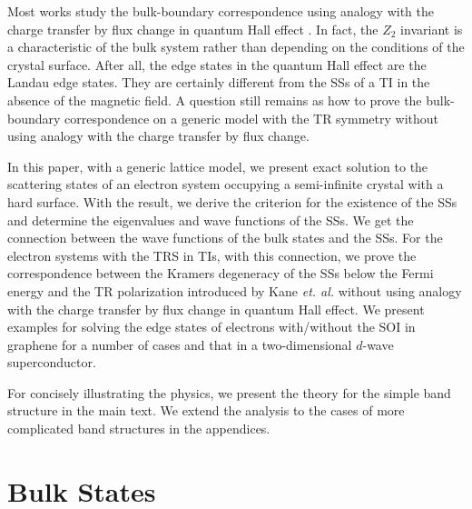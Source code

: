 \documentclass[aps,pra,amsmath,twocolumn,showpacs,bibnotes,10pt]{revtex4-1}
\begin{document}
Most works study the bulk-boundary correspondence using analogy with the charge transfer by flux change in quantum Hall effect \cite{Kane2,Fu,Fu2,Fu3,Qi2,Roy,Roy2}. In fact, the $Z_2$ invariant is a characteristic of the bulk system rather than depending on the conditions of the crystal surface. After all, the edge states in the quantum Hall effect are the Landau edge states. They are certainly different from the SSs of a TI in the absence of the magnetic field. A question still remains as how to prove the bulk-boundary correspondence on a generic model with the TR symmetry without using analogy with the charge transfer by flux change. 

In this paper, with a generic lattice model, we present exact solution to the scattering states of an electron system occupying a semi-infinite crystal with a hard surface. With the result, we derive the criterion for the existence of the SSs and determine the eigenvalues and wave functions of the SSs. We get the connection between the wave functions of the bulk states and the SSs. For the electron systems with the TRS in TIs, with this connection, we prove the correspondence between the Kramers degeneracy of the SSs below the Fermi energy and the TR polarization introduced by Kane {\it et. al.} without using analogy with the charge transfer by flux change in quantum Hall effect. We present examples for solving the edge states of electrons with/without the SOI in graphene for a number of cases and that in a two-dimensional $d$-wave superconductor.

For concisely illustrating the physics, we present the theory for the simple band structure in the main text. We extend the analysis to the cases of more complicated band structures in the appendices. 

\section{Bulk States} 
\end{document}
